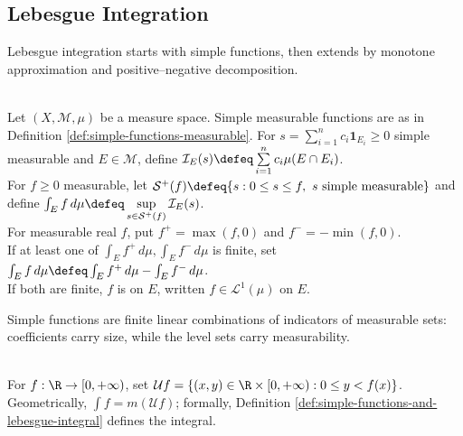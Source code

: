 \subsection{Lebesgue Integration}

%

Lebesgue integration starts with simple functions, then extends by monotone approximation and positive--negative decomposition.

\begin{definition} \label{def:lebesgue-product-core-source-todo}\label{def:simple-functions-and-lebesgue-integral} \\
Let $(X,\mathcal{M},\mu)$ be a measure space. Simple measurable functions are as in Definition \ref{def:simple-functions-measurable}.
For $s=\sum_{i=1}^{n}c_i\mathbf{1}_{E_i}\geq0$ simple measurable and $E\in\mathcal{M}$, define $\mathcal{I}_E(s)\defeq\sum\limits_{i=1}^{n}c_i\mu(E\cap E_i)$.\\
For $f\geq0$ measurable, let $\mathcal{S}^+(f)\defeq\{s:0\leq s\leq f,\ s\text{ simple measurable}\}$ and define $\int_E f\,d\mu\defeq\sup\limits_{s\in\mathcal{S}^+(f)}\mathcal{I}_E(s)$.\\
For measurable real $f$, put $f^+=\max(f,0)$ and $f^-=-\min(f,0)$.\\
If at least one of $\int_E f^+\,d\mu,\int_E f^-\,d\mu$ is finite, set $\int_E f\,d\mu\defeq\int_E f^+\,d\mu-\int_E f^-\,d\mu$.\\
If both are finite, $f$ is  on $E$, written $f\in\mathscr{L}^1(\mu)$ on $E$.
\end{definition}

Simple functions are finite linear combinations of indicators of measurable sets: coefficients carry size, while the level sets carry measurability.

\begin{perspective} \label{per:undergraph-geometric-integral} \\
For $f:\R\to[0,+\infty)$, set $\mathcal{U}f=\{(x,y)\in\R\times[0,+\infty):0\leq y<f(x)\}$.\\
Geometrically, $\int f=m(\mathcal{U}f)$; formally, Definition \ref{def:simple-functions-and-lebesgue-integral} defines the integral.
\end{perspective}

